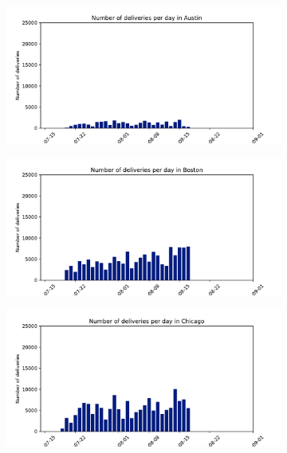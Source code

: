 \begin{figure}[H]
    \centering
    \caption{Distribuição temporal de entregas nas cinco operações estudadas (Amazon)}
    \label{fig:amazon_times}
    \begin{subfigure}{.45\textwidth}
        \includegraphics[width=\textwidth]{images/6_amazon/times/austin_deliveries_times.pdf}
    \end{subfigure}
    \begin{subfigure}{.45\textwidth}
        \includegraphics[width=\textwidth]{images/6_amazon/times/boston_deliveries_times.pdf}
    \end{subfigure}
    \begin{subfigure}{.45\textwidth}
        \includegraphics[width=\textwidth]{images/6_amazon/times/chicago_deliveries_times.pdf}

\end{subfigure}
\end{figure}

